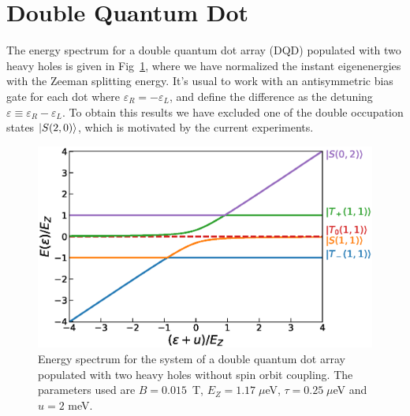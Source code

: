 \documentclass[a4paper,11pt]{article}
\begin{document}
\section{\label{sec:DQD}Double Quantum Dot}
The energy spectrum for a double quantum dot array (DQD) populated with two heavy holes is given in Fig~\ref{fig:eigenenergies_2QD_2HH_wo_SOC}, where we have normalized the instant eigenenergies with the Zeeman splitting energy. It's usual to work with an antisymmetric bias gate for each dot where $\varepsilon_R=-\varepsilon_L$, and define the difference as the detuning $\varepsilon\equiv \varepsilon_R-\varepsilon_L$. To obtain this results we have excluded one of the double occupation states $\ket{S(2,0)}$, which is motivated by the current experiments.
\begin{figure}[!htbp]
	\centering
	\includegraphics[width=0.8\linewidth]{eigenenergies_2QD_2HH_wo_SOC.eps}
	\caption{Energy spectrum for the system of a double quantum dot array populated with two heavy holes without spin orbit coupling. The parameters used are $B=0.015$~T, $E_Z=1.17\; \mu$eV, $\tau=0.25\; \mu$eV and $u=2$ meV.}
	\label{fig:eigenenergies_2QD_2HH_wo_SOC}
\end{figure}
\end{document}
